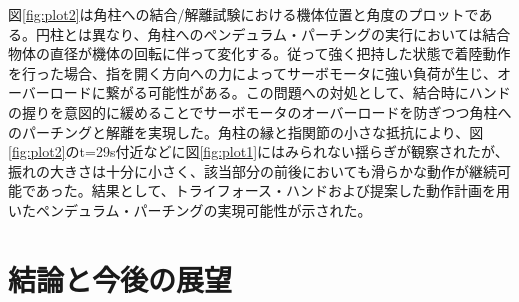 \documentclass{jarticle}
\begin{document}
図\ref{fig:plot2}は角柱への結合/解離試験における機体位置と角度のプロットである。円柱とは異なり、角柱へのペンデュラム・パーチングの実行においては結合物体の直径が機体の回転に伴って変化する。従って強く把持した状態で着陸動作を行った場合、指を開く方向への力によってサーボモータに強い負荷が生じ、オーバーロードに繋がる可能性がある。この問題への対処として、結合時にハンドの握りを意図的に緩めることでサーボモータのオーバーロードを防ぎつつ角柱へのパーチングと解離を実現した。角柱の縁と指関節の小さな抵抗により、図\ref{fig:plot2}のt=29s付近などに図\ref{fig:plot1}にはみられない揺らぎが観察されたが、振れの大きさは十分に小さく、該当部分の前後においても滑らかな動作が継続可能であった。結果として、トライフォース・ハンドおよび提案した動作計画を用いたペンデュラム・パーチングの実現可能性が示された。

\section{結論と今後の展望}

\footnotesize





\normalsize
\end{document}

